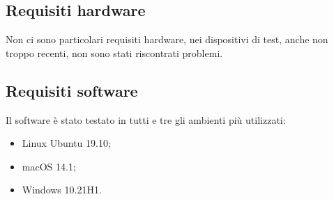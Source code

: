 
	\subsection{Requisiti hardware}
	Non ci sono particolari requisiti hardware, nei dispositivi di test, anche non troppo recenti, non sono stati riscontrati problemi.
	
	\subsection{Requisiti software}
	Il software è stato testato in tutti e tre gli ambienti più utilizzati:
	\begin{itemize}
		\item Linux Ubuntu 19.10;
		\item macOS 14.1;
		\item Windows 10.21H1.
	\end{itemize}  
	